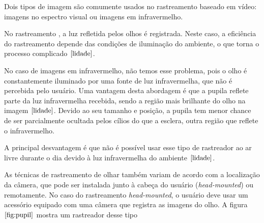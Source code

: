 
Dois tipos de imagem são comumente usados no rastreamento baseado em vídeo: imagens no espectro visual ou imagens em infravermelho.

No rastreamento , a luz refletida pelos olhos é registrada. Neste caso, a eficiência do rastreamento depende das condições de iluminação do ambiente, o que torna o processo complicado $\cite{lidade}$.

No caso de imagens em infravermelho, não temos esse problema, pois o olho é constantemente iluminado por uma fonte de luz infravermelha, que não é percebida pelo usuário. Uma vantagem desta abordagem é que a pupila reflete parte da luz infravermelha recebida, sendo a região mais brilhante do olho na imagem $\cite{lidade}$. Devido ao seu tamanho e posição, a pupila tem menor chance de ser parcialmente ocultada pelos  cílios do que a esclera, outra região que reflete o infravermelho. %

A principal desvantagem é que não é possível usar esse tipo de rastreador ao ar livre durante o dia devido à luz infravermelha do ambiente $\cite{lidade}$.

As técnicas de rastreamento de olhar também variam de acordo com a localização da câmera, que pode ser instalada junto à cabeça do usuário (\textit{head-mounted}) ou remotamente. No caso do rastreamento \textit{head-mounted}, o usuário deve usar um acessório equipado com uma câmera que registra as imagens do olho. A figura $\ref{fig:pupil}$ mostra um rastreador desse tipo


